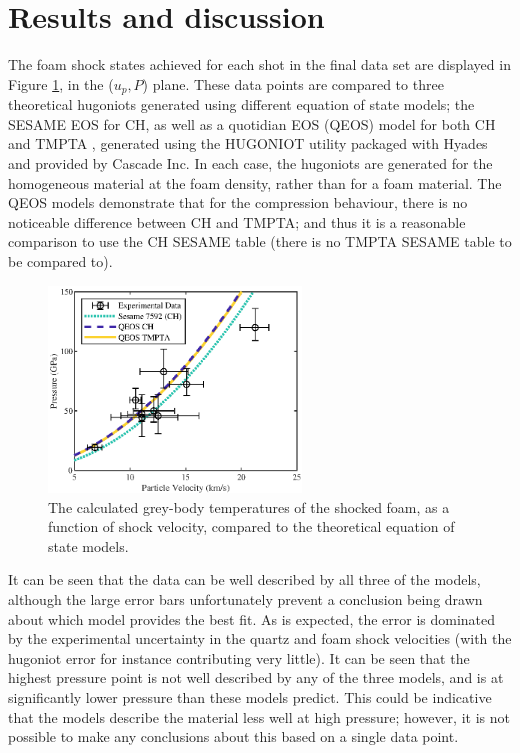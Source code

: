 \section{Results and discussion} \label{Experiment Results}

The foam shock states achieved for each shot in the final data set are displayed in Figure \ref{fig:Hugoniot Results}, in the ($u_p,P$) plane. These data points are compared to three theoretical hugoniots generated using different equation of state models; the SESAME EOS for CH, as well as a quotidian EOS (QEOS) model for both CH and TMPTA \cite{More1988}, generated using the HUGONIOT utility packaged with Hyades and provided by Cascade Inc. In each case, the hugoniots are generated for the homogeneous material at the foam density, rather than for a foam material. The QEOS models demonstrate that for the compression behaviour, there is no noticeable difference between CH and TMPTA; and thus it is a reasonable comparison to use the CH SESAME table (there is no TMPTA SESAME table to be compared to).

\begin{figure} [h!]
\begin{centering}
\includegraphics[width=0.6\textwidth]{figures/Experiment/Hugoniot.eps}%
\caption{\label{fig:Hugoniot Results} The calculated grey-body temperatures of the shocked foam, as a function of shock velocity, compared to the theoretical equation of state models.}
\end{centering}
\end{figure}

It can be seen that the data can be well described by all three of the models, although the large error bars unfortunately prevent a conclusion being drawn about which model provides the best fit. As is expected, the error is dominated by the experimental uncertainty in the quartz and foam shock velocities (with the hugoniot error for instance contributing very little). It can be seen that the highest pressure point is not well described by any of the three models, and is at significantly lower pressure than these models predict. This could be indicative that the models describe the material less well at high pressure; however, it is not possible to make any conclusions about this based on a single data point.

